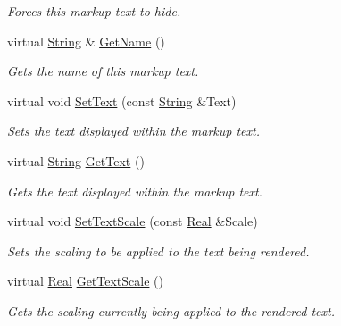\begin{DoxyCompactItemize}
\begin{DoxyCompactList}\small\item\em Forces this markup text to hide. \item\end{DoxyCompactList}\item 
virtual \hyperlink{namespacephys_aa03900411993de7fbfec4789bc1d392e}{String} \& \hyperlink{classphys_1_1UI_1_1MarkupText_afa64067f890466ad4844c4836e7667fd}{GetName} ()
\begin{DoxyCompactList}\small\item\em Gets the name of this markup text. \item\end{DoxyCompactList}\item 
virtual void \hyperlink{classphys_1_1UI_1_1MarkupText_a1c2989d96cb297b61ee4050bfe79fe23}{SetText} (const \hyperlink{namespacephys_aa03900411993de7fbfec4789bc1d392e}{String} \&Text)
\begin{DoxyCompactList}\small\item\em Sets the text displayed within the markup text. \item\end{DoxyCompactList}\item 
virtual \hyperlink{namespacephys_aa03900411993de7fbfec4789bc1d392e}{String} \hyperlink{classphys_1_1UI_1_1MarkupText_af5d8a7e6ca03e15fc488608c28a54c1e}{GetText} ()
\begin{DoxyCompactList}\small\item\em Gets the text displayed within the markup text. \item\end{DoxyCompactList}\item 
virtual void \hyperlink{classphys_1_1UI_1_1MarkupText_ada66a8df7627bd30021728232afdcf59}{SetTextScale} (const \hyperlink{namespacephys_af7eb897198d265b8e868f45240230d5f}{Real} \&Scale)
\begin{DoxyCompactList}\small\item\em Sets the scaling to be applied to the text being rendered. \item\end{DoxyCompactList}\item 
virtual \hyperlink{namespacephys_af7eb897198d265b8e868f45240230d5f}{Real} \hyperlink{classphys_1_1UI_1_1MarkupText_aa69d77428171e0c49c51a5d1854ffaff}{GetTextScale} ()
\begin{DoxyCompactList}\small\item\em Gets the scaling currently being applied to the rendered text. \item\end{DoxyCompactList}\item 

\end{DoxyCompactItemize}
